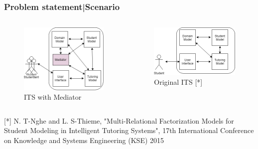 \documentclass{beamer}
\begin{document}
\begin{frame}
\frametitle{Problem statement|Scenario}
\begin{columns}[onlytextwidth]
	\begin{column}{.45\textwidth}
		\begin{figure}
			\includegraphics[width=.8\textwidth]{pp1}

				\caption{ITS with Mediator}
		\end{figure}
	\end{column}
	\hfill
	\begin{column}{.45\textwidth}
		\begin{figure}
			\includegraphics[width=.8\textwidth]{pp2}
					\caption{Original ITS [*]}

					
		\end{figure}
	
	\end{column}

\end{columns}
\begin{flushright}
	
\end{flushright}
{\tiny 					[*] N. T-Nghe and L. S-Thieme, "Multi-Relational Factorization Models for Student Modeling in Intelligent Tutoring Systems",  17th International Conference on Knowledge and Systems Engineering (KSE) 2015
}
\end{frame}
\end{document}
